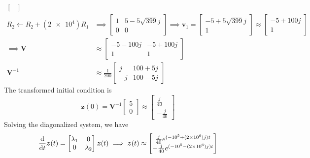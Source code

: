 \documentclass{article}
\begin{document}
\begin{align}
\begin{bmatrix}
    \end{bmatrix} \\
    R_2 \leftarrow R_2 + (\num{2e4}) R_1 &\implies \begin{bmatrix}
        1 & 5 - 5 \sqrt{399} j \\
        0 & 0
    \end{bmatrix} \implies \bm{v}_1 =
    \begin{bmatrix}
        -5 + 5 \sqrt{399} j \\
        1
    \end{bmatrix} \approx
    \begin{bmatrix}
        -5 + 100j \\
        1
    \end{bmatrix} \\
    \implies \bm{V} &\approx
    \begin{bmatrix}
        -5 - 100j & -5 + 100j \\
        1 & 1
    \end{bmatrix} \\
    \bm{V}^{-1} &\approx
    \frac{1}{200} \begin{bmatrix}
        j & 100 + 5j \\
        -j & 100 - 5j
    \end{bmatrix}
\end{align}
The transformed initial condition is
\begin{equation}
    \bm{z}(0) = \bm{V}^{-1}
    \begin{bmatrix}
        5 \\
        0
    \end{bmatrix} \approx
    \begin{bmatrix}
        \frac{j}{40} \\
        -\frac{j}{40}
    \end{bmatrix}
\end{equation}
Solving the diagonalized system, we have
\begin{equation}
    \dv{t} \bm{z}(t) =
    \begin{bmatrix}
        \lambda_1 & 0 \\
        0 & \lambda_2
    \end{bmatrix} \bm{z}(t) \implies \bm{z}(t) \approx
    \begin{bmatrix}
        \frac{j}{40} e^{(-10^5 + (\num{2e6}) j) t} \\
        -\frac{j}{40} e^{(-10^5 - (\num{2e6}) j) t}
    \end{bmatrix}
\end{equation}
\end{document}
